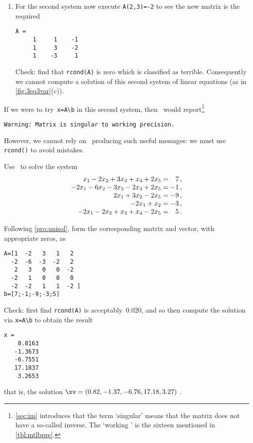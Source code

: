 \begin{example}
\begin{solution}
\begin{enumerate}
\item For the second system now execute \verb|A(2,3)=-2| to see the new matrix is the required
\begin{verbatim}
A =
     1     1    -1
     1     3    -2
     1    -3     1
\end{verbatim}
Check: find that \verb|rcond(A)| is zero which is classified as terrible.
Consequently we cannot compute a solution of this second system of linear equations (as in \cref{fig:3eq3var}(c)).
\end{enumerate}
If we were to try~\verb|x=A\b| in this second system, then \script\ would report\footnote{\cref{sec:im} introduces that the term `singular' means that the matrix does not have a so-called inverse.  The `working ' is the sixteen  mentioned in \cref{tbl:mtlbpre}.}%
\begin{verbatim}
Warning: Matrix is singular to working precision. 
\end{verbatim}
However, we cannot rely on \script\ producing such useful messages: we must use \verb|rcond()| to avoid mistakes.
\end{solution}
\end{example}



\begin{example} \label{eg:5eqns5vars}
Use \script\ to solve the system
\begin{equation*}
\begin{array}{r@{{}={}}r}
x_1-2x_2+3x_3+x_4+2x_5&7\,,\\
-2x_1-6x_2-3x_3-2x_4+2x_5&-1\,,\\
2x_1+3x_2-2x_5&-9\,,\\
-2x_1+x_2&-3\,,\\
-2x_1-2x_2+x_3+x_4-2x_5&5\,.
\end{array}
\end{equation*}

\begin{solution} 
Following \cref{pro:unisol}, form the corresponding matrix and vector, with appropriate zeros, as
\begin{verbatim}
A=[1  -2   3   1   2
  -2  -6  -3  -2   2
   2   3   0   0  -2
  -2   1   0   0   0
  -2  -2   1   1  -2 ]
b=[7;-1;-9;-3;5]
\end{verbatim}
Check: first find \verb|rcond(A)| is acceptably~\(0.020\), and so then compute the solution via \verb|x=A\b| to obtain the result
\setbox\ajrqrbox\hbox{}%
\marginajrbox%
\begin{verbatim}
x =
    0.8163
   -1.3673
   -6.7551
   17.1837
    3.2653
\end{verbatim}
that is, the solution \(\xv=(0.82,-1.37,-6.76,17.18,3.27)\) \twodp.
\end{solution}
\end{example}


